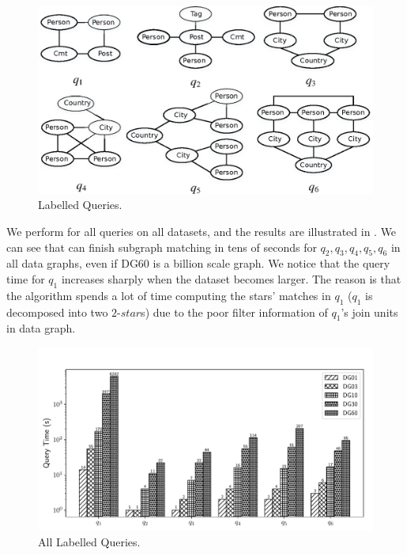 \begin{figure}[htb]
  \centering
  \includegraphics[scale=0.6]{figures/lq.eps}
  \caption{\small{Labelled Queries.}}
  \label{fig:lq}
\end{figure}

 We perform \gencliqjoin for all queries on all datasets, and the results are illustrated in . We can see that \gencliqjoin can finish subgraph matching in tens of seconds for $q_2, q_3, q_4, q_5, q_6$ in all data graphs, even if DG60 is a billion scale graph. We notice that the query time for $q_1$ increases sharply when the dataset becomes larger. The reason is that the algorithm spends a lot of time computing the stars' matches in $q_1$ ($q_1$ is decomposed into two $2\text{-}star$s) due to the poor filter information of $q_1$'s join units in data graph.

\begin{figure}[htb]
  \centering
  \includegraphics[scale=0.4]{figures/exp4.pdf}
  \caption{\small{All Labelled Queries.}}
  \label{fig:all_lq}
\end{figure}


